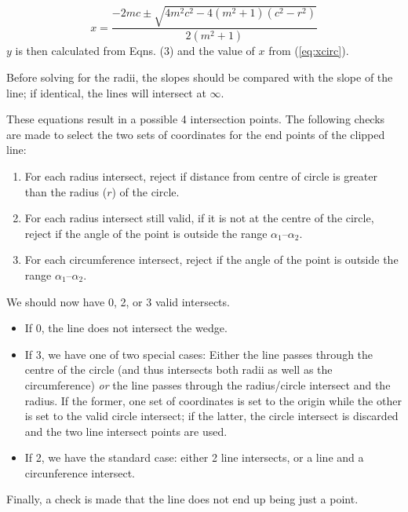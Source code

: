 \begin{equation}
\label{eq:xcirc}
x = \frac{-2mc \pm\sqrt{4m^2c^2 - 4(m^2+1)(c^2-r^2)}}{2(m^2+1)}
\end{equation}
$y$ is then calculated from Eqns. (3) and the value of $x$ from (\ref{eq:xcirc}).
\vspace{2em}

Before solving for the radii, the slopes should be compared with the slope of the 
line; if identical, the lines will intersect at $\infty$.

These equations result in a possible 4 intersection points. The following checks are 
made to select the two sets of coordinates for the end points of the clipped line:
\begin{enumerate}
\item For each radius intersect, reject if distance from centre of circle is greater 
than the radius ($r$) of the circle.
\item For each radius intersect still valid, if it is not at the centre of the
circle, reject if the angle of the point is outside the range $\alpha_1$--$\alpha_2$.
\item For each circumference intersect, reject if the angle of the point is 
outside the range $\alpha_1$--$\alpha_2$.
\end{enumerate}
We should now have 0, 2, or 3 valid intersects. 
\begin{itemize}
\item If 0, the line does not intersect the wedge. 
\item If 3, we have one of two special cases: Either the line passes through 
the centre of the circle (and thus intersects both radii as well as the 
circumference) {\em or\/} the line passes through the radius/circle intersect and 
the radius. If the former, one set of coordinates is set to the origin while the 
other is set to the valid circle intersect; if the latter, the circle intersect is 
discarded and the two line intersect points are used.
\item If 2, we have the standard case: either 2 line intersects, or a line and a 
circunference intersect.
\end{itemize}
Finally, a check is made that the line does not end up being just a point.





